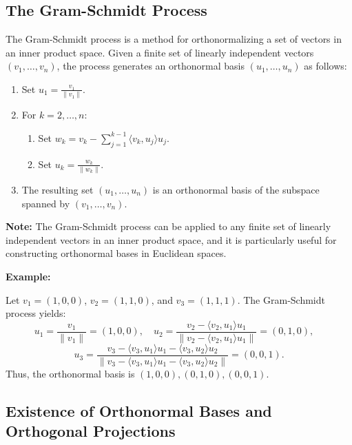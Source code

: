 \subsection{The Gram-Schmidt Process}

The Gram-Schmidt process is a method for orthonormalizing a set of vectors in an inner product space. Given a finite set of linearly independent vectors \( (v_1, \ldots, v_n) \), the process generates an orthonormal basis \( (u_1, \ldots, u_n) \) as follows:
\begin{enumerate}
    \item Set \( u_1 = \frac{v_1}{\|v_1\|} \).
    \item For \( k = 2, \ldots, n \):
    \begin{enumerate}
        \item Set \( w_k = v_k - \sum_{j=1}^{k-1} \langle v_k, u_j \rangle u_j \).
        \item Set \( u_k = \frac{w_k}{\|w_k\|} \).
    \end{enumerate}
    \item The resulting set \( (u_1, \ldots, u_n) \) is an orthonormal basis of the subspace spanned by \( (v_1, \ldots, v_n) \).
\end{enumerate}
\textbf{Note:} The Gram-Schmidt process can be applied to any finite set of linearly independent vectors in an inner product space, and it is particularly useful for constructing orthonormal bases in Euclidean spaces.

\textbf{Example:} 

Let \( v_1 = (1, 0, 0) \), \( v_2 = (1, 1, 0) \), and \( v_3 = (1, 1, 1) \). The Gram-Schmidt process yields:
\[
u_1 = \frac{v_1}{\|v_1\|} = (1, 0, 0), \quad
u_2 = \frac{v_2 - \langle v_2, u_1 \rangle u_1}{\|v_2 - \langle v_2, u_1 \rangle u_1\|} = \left(0, 1, 0\right), \quad
\]
\[
u_3 = \frac{v_3 - \langle v_3, u_1 \rangle u_1 - \langle v_3, u_2 \rangle u_2}{\|v_3 - \langle v_3, u_1 \rangle u_1 - \langle v_3, u_2 \rangle u_2\|} = \left(0, 0, 1\right).
\]
Thus, the orthonormal basis is \( (1, 0, 0), (0, 1, 0), (0, 0, 1) \).

\subsection{Existence of Orthonormal Bases and Orthogonal Projections}

